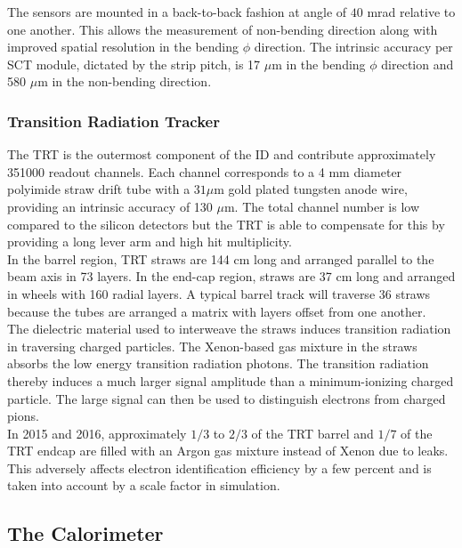 \indent The sensors are mounted in a back-to-back fashion at angle of $40$ mrad relative to one another.  This allows the measurement of non-bending direction along with improved spatial resolution in the bending $\phi$ direction. The intrinsic accuracy per SCT module, dictated by the strip pitch, is 17 $\mu$m in the bending $\phi$ direction and 580 $\mu$m in the non-bending direction.\\

\subsubsection*{Transition Radiation Tracker}

\indent The TRT is the outermost component of the ID and contribute approximately 351000 readout channels.  Each channel corresponds to a 4 mm diameter polyimide straw drift tube with a $31 \mu$m gold plated tungsten anode wire, providing an intrinsic accuracy of 130 $\mu$m.  The total channel number is low compared to the silicon detectors but the TRT is able to compensate for this by providing a long lever arm and high hit multiplicity.  \\

\indent In the barrel region, TRT straws are 144 cm long and arranged parallel to the beam axis in 73 layers. In the end-cap region, straws are 37 cm long and arranged in wheels with 160 radial layers.  A typical barrel track will traverse 36 straws because the tubes are arranged a matrix with layers offset from one another.\\

\indent The dielectric material used to interweave the straws induces transition radiation in traversing charged particles.  The Xenon-based gas mixture in the straws absorbs the low energy transition radiation photons. The transition radiation thereby induces a much larger signal amplitude than a minimum-ionizing charged particle.  The large signal can then be used to distinguish electrons from charged pions.  \\

\indent In 2015 and 2016, approximately $1/3$ to $2/3$ of the TRT barrel and $1/7$ of the TRT endcap are filled with an Argon gas mixture instead of Xenon due to leaks.  This adversely affects electron identification efficiency by a few percent and is taken into account by a scale factor in simulation.  \\

\subsection{The Calorimeter}
\label{LHC:Calorimeter}

